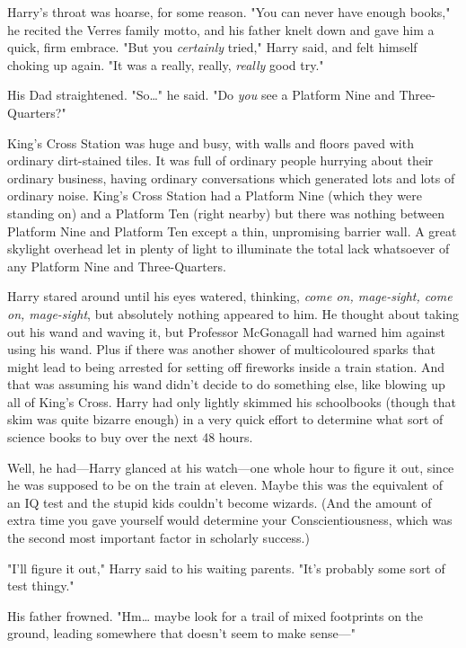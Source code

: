 Harry's throat was hoarse, for some reason. "You can never have enough books," 
he recited the Verres family motto, and his father knelt down and gave him a 
quick, firm embrace. "But you \emph{certainly} tried," Harry said, and felt 
himself choking up again. "It was a really, really, \emph{really} good try."

His Dad straightened. "So{\ldots}" he said. "Do \emph{you} see a Platform Nine 
and Three-Quarters?"

King's Cross Station was huge and busy, with walls and floors paved with 
ordinary dirt-stained tiles. It was full of ordinary people hurrying about 
their ordinary business, having ordinary conversations which generated lots and 
lots of ordinary noise. King's Cross Station had a Platform Nine (which they 
were standing on) and a Platform Ten (right nearby) but there was nothing 
between Platform Nine and Platform Ten except a thin, unpromising barrier wall. 
A great skylight overhead let in plenty of light to illuminate the total lack 
whatsoever of any Platform Nine and Three-Quarters.

Harry stared around until his eyes watered, thinking, \emph{come on, 
mage-sight, come on, mage-sight}, but absolutely nothing appeared to him. He 
thought about taking out his wand and waving it, but Professor McGonagall had 
warned him against using his wand. Plus if there was another shower of 
multicoloured sparks that might lead to being arrested for setting off 
fireworks inside a train station. And that was assuming his wand didn't decide 
to do something else, like blowing up all of King's Cross. Harry had only 
lightly skimmed his schoolbooks (though that skim was quite bizarre enough) in 
a very quick effort to determine what sort of science books to buy over the 
next 48 hours.

Well, he had---Harry glanced at his watch---one whole hour to figure it out, 
since he was supposed to be on the train at eleven. Maybe this was the 
equivalent of an IQ test and the stupid kids couldn't become wizards. (And the 
amount of extra time you gave yourself would determine your Conscientiousness, 
which was the second most important factor in scholarly success.)

"I'll figure it out," Harry said to his waiting parents. "It's probably some 
sort of test thingy."

His father frowned. "Hm{\ldots} maybe look for a trail of mixed footprints on 
the ground, leading somewhere that doesn't seem to make sense---"

